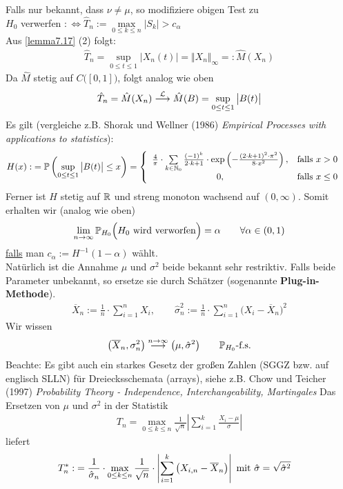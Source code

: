Falls nur bekannt, dass $\nu\neq\mu$, so modifiziere obigen Test zu\\
$H_0$ verwerfen $:\Longleftrightarrow\hat{T}_n:=\max\limits_{0\leq k\leq n}\big|S_k\big|>c_\alpha$\\
Aus \ref{lemma7.17} (2) folgt:
\begin{align*}
\hat{T}_n=\sup\limits_{0\leq t\leq 1}\big|X_n(t)\big|=\Vert X_n\Vert_\infty=:\hat{M}(X_n)
\end{align*}
Da $\hat{M}$ stetig auf $C\big([0,1]\big)$, folgt analog wie oben
\begin{align*}
\hat{T}_n=\hat{M}(X_n)\stackrel{\L}{\longrightarrow}\hat{M}(B)=\sup\limits_{0\leq t\leq 1}\big|B(t)\big|
\end{align*}
Es gilt (vergleiche z.B. Shorak und Wellner (1986) \textit{Empirical Processes with applications to statistics}):
\begin{align*}
H(x):&=\P\left(\sup\limits_{0\leq t\leq 1}\big|B(t)\big|\leq x\right)
=\left\lbrace\begin{array}{cl}
\frac{4}{\pi}\cdot\sum\limits_{k\in\N_0}\frac{(-1)^k}{2\cdot k+1}\cdot\exp\left(-\frac{(2\cdot k+1)^2\cdot\pi^2}{8\cdot x^2}\right), &\falls x>0\\
0, &\falls x\leq 0
\end{array}\right.
\end{align*}
Ferner ist $H$ stetig auf $\R$ und streng monoton wachsend auf $(0,\infty)$. Somit erhalten wir (analog wie oben)
\begin{align*}
\limn\P_{H_0}\Big(H_0\text{ wird verworfen}\Big)=\alpha\qquad\forall\alpha\in(0,1)
\end{align*}
\ul{falls} man $c_\alpha:=H^{-1}(1-\alpha)$ wählt.\\
Natürlich ist die Annahme $\mu$ und $\sigma^2$ beide bekannt sehr restriktiv. Falls beide Parameter unbekannt, so ersetze sie durch Schätzer (sogenannte \textbf{Plug-in-Methode}).
\begin{align*}
\overline{X}_n:=\frac{1}{n}\cdot\sum\limits_{i=1}^n X_i,\qquad 
\hat{\sigma}_n^2:=\frac{1}{n}\cdot\sum\limits_{i=1}^n\big(X_i-\overline{X}_n\big)^2
\end{align*}
Wir wissen
\begin{align*}
\big(\overline{X}_n,\sigma_n^2\big)\stackrel{n\to\infty}{\longrightarrow}\big(\mu,\hat{\sigma}^2\big)\qquad\P_{H_0}\text{-f.s.}
\end{align*}
Beachte: Es gibt auch ein starkes Gesetz der großen Zahlen (SGGZ bzw. auf englisch SLLN) für Dreiecksschemata (arrays), siehe z.B. Chow und Teicher (1997) \textit{Probability Theory - Independence, Interchangeability, Martingales}\nl
Das Ersetzen von $\mu$ und $\sigma^2$ in der Statistik
\begin{align*}
T_n=\max\limits_{0\leq k\leq n}\frac{1}{\sqrt{n}}\left|\sum\limits_{i=1}^k\frac{X_i-\mu}{\sigma}\right|
\end{align*}
liefert
\begin{align*}
T_n^\ast
:&=\frac{1}{\hat{\sigma}_n}\cdot\max\limits_{0\leq k\leq n}\frac{1}{\sqrt{n}}\cdot\left|\sum\limits_{i=1}^k \big(X_{i,n}-\overline{X}_n\big)\right|
\mit \hat{\sigma}=\sqrt{\hat{\sigma}^2}
\end{align*}


